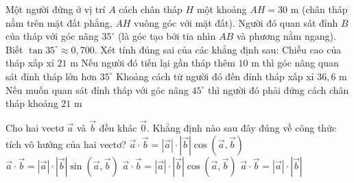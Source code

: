 \begin{ex}%
Một người đứng ở vị trí $A$ cách chân tháp $H$ một khoảng $AH=30$ m (chân tháp nằm trên mặt đất phẳng, $AH$ vuông góc với mặt đất). Người đó quan sát đỉnh $B$ của tháp với góc nâng $35^\circ$ (là góc tạo bởi tia nhìn $AB$ và phương nằm ngang). Biết $\tan 35^\circ\approx 0{,}700$. Xét tính đúng sai của các khẳng định sau:
\choiceTF
{\True Chiều cao của tháp xấp xỉ $21$ m}
{\True Nếu người đó tiến lại gần tháp thêm $10$ m thì góc nâng quan sát đỉnh tháp lớn hơn $35^\circ$}
{\True Khoảng cách từ người đó đến đỉnh tháp xấp xỉ $36{,}6$ m}
{\True Nếu muốn quan sát đỉnh tháp với góc nâng $45^\circ$ thì người đó phải đứng cách chân tháp khoảng $21$ m}
\end{ex}

\begin{ex}%
Cho hai vectơ $\overrightarrow{a}$ và $\overrightarrow{b}$ đều khác $\overrightarrow{0}$. Khẳng định nào sau đây đúng về công thức tích vô hướng của hai vectơ?
\choice
{$\overrightarrow{a}\cdot\overrightarrow{b}=|\overrightarrow{a}|\cdot|\overrightarrow{b}|\cos(\overrightarrow{a},\overrightarrow{b})$}
{$\overrightarrow{a}\cdot\overrightarrow{b}=|\overrightarrow{a}|\cdot|\overrightarrow{b}|\sin(\overrightarrow{a},\overrightarrow{b})$}
{\True $\overrightarrow{a}\cdot\overrightarrow{b}=|\overrightarrow{a}|\cdot|\overrightarrow{b}|\cos(\overrightarrow{a},\overrightarrow{b})$}
{$\overrightarrow{a}\cdot\overrightarrow{b}=|\overrightarrow{a}|\cdot|\overrightarrow{b}|$}
\end{ex}

